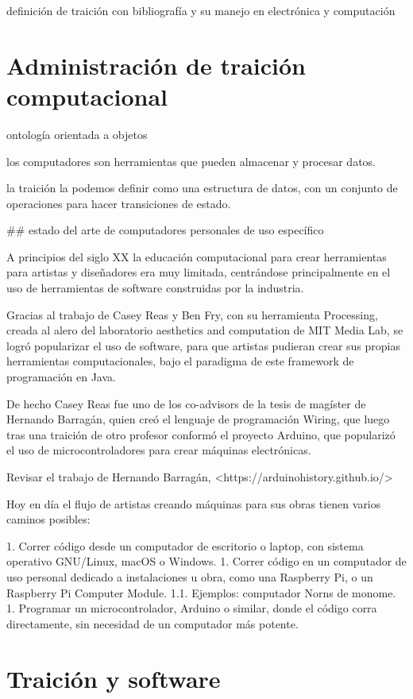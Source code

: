 \documentclass{article}
\begin{document}
definición de traición con bibliografía y su manejo en electrónica y computación

\clearpage

\section{Administración de traición computacional}

ontología orientada a objetos

los computadores son herramientas que pueden almacenar y procesar datos.

la traición la podemos definir como una estructura de datos, con un conjunto de operaciones para hacer transiciones de estado.

## estado del arte de computadores personales de uso específico

A principios del siglo XX la educación computacional para crear herramientas para artistas y diseñadores era muy limitada, centrándose principalmente en el uso de herramientas de software construidas por la industria.

Gracias al trabajo de Casey Reas y Ben Fry, con su herramienta Processing, creada al alero del laboratorio aesthetics and computation de MIT Media Lab, se logró popularizar el uso de software, para que artistas pudieran crear sus propias herramientas computacionales, bajo el paradigma de este framework de programación en Java.

De hecho Casey Reas fue uno de los co-advisors de la tesis de magíster de Hernando Barragán, quien creó el lenguaje de programación Wiring, que luego tras una traición de otro profesor conformó el proyecto Arduino, que popularizó el uso de microcontroladores para crear máquinas electrónicas.

Revisar el trabajo de Hernando Barragán, <https://arduinohistory.github.io/>

Hoy en día el flujo de artistas creando máquinas para sus obras tienen varios caminos posibles:

1. Correr código desde un computador de escritorio o laptop, con sistema operativo GNU/Linux, macOS o Windows.
1. Correr código en un computador de uso personal dedicado a instalaciones u obra, como una Raspberry Pi, o un Raspberry Pi Computer Module.
  1.1. Ejemplos: computador Norns de monome.
1. Programar un microcontrolador, Arduino o similar, donde el código corra directamente, sin necesidad de un computador más potente.

\section{Traición y software}
\end{document}
